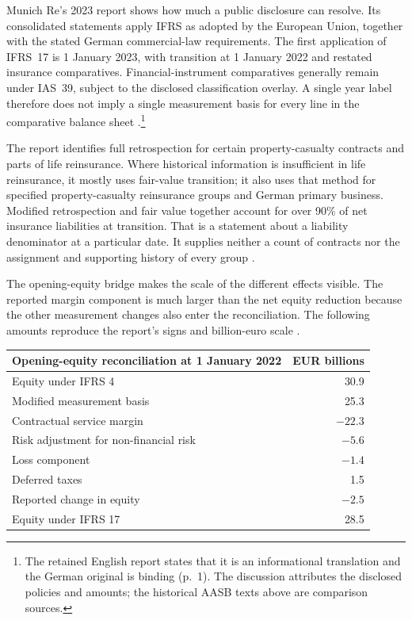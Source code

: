 Munich Re's 2023 report shows how much a public disclosure can resolve.
Its consolidated statements apply IFRS as adopted by the European Union,
together with the stated German commercial-law requirements. The first
application of IFRS~17 is 1 January 2023, with transition at 1 January 2022
and restated insurance comparatives. Financial-instrument comparatives
generally remain under IAS~39, subject to the disclosed classification
overlay. A single year label therefore does not imply a single measurement
basis for every line in the comparative balance sheet
\citep[pp.~155 and 183--184]{munichre2023annual}.\footnote{The retained
English report states that it is an informational translation and the German
original is binding (p.~1). The discussion attributes the disclosed policies
and amounts; the historical AASB texts above are comparison sources.}

The report identifies full retrospection for certain property-casualty
contracts and parts of life reinsurance. Where historical information is
insufficient in life reinsurance, it mostly uses fair-value transition; it
also uses that method for specified property-casualty reinsurance groups and
German primary business. Modified retrospection and fair value together
account for over 90\% of net insurance liabilities at transition. That is a
statement about a liability denominator at a particular date. It supplies
neither a count of contracts nor the assignment and supporting history of
every group \citep[p.~183]{munichre2023annual}.

The opening-equity bridge makes the scale of the different effects visible.
The reported margin component is much larger than the net equity reduction
because the other measurement changes also enter the reconciliation. The
following amounts reproduce the report's signs and billion-euro scale
\citep[p.~184]{munichre2023annual}.

\begin{center}
\begin{tabular}{lr}
\toprule
Opening-equity reconciliation at 1 January 2022 & EUR billions \\
\midrule
Equity under IFRS 4 & 30.9 \\
Modified measurement basis & 25.3 \\
Contractual service margin & $-22.3$ \\
Risk adjustment for non-financial risk & $-5.6$ \\
Loss component & $-1.4$ \\
Deferred taxes & 1.5 \\
Reported change in equity & $-2.5$ \\
Equity under IFRS 17 & 28.5 \\
\bottomrule
\end{tabular}
\end{center}

